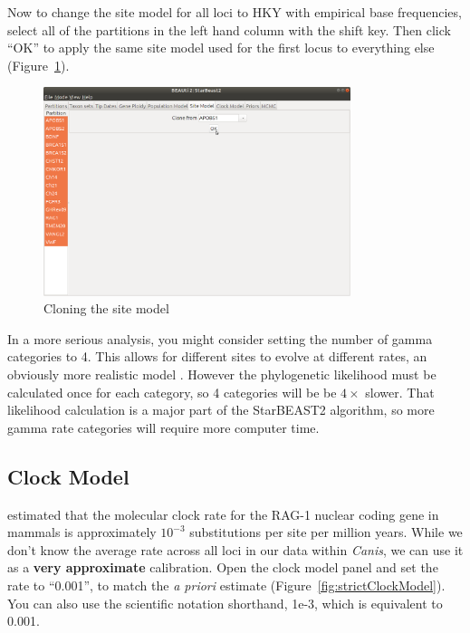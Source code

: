 \documentclass[12pt]{article}
\begin{document}
Now to change the site model for all loci to HKY with empirical base frequencies,
select all of the partitions in the left hand column with the shift key. Then
click ``OK'' to apply the same site model used for the first locus
to everything else (Figure~\ref{fig:cloneSiteModel}).

\begin{figure}[htb!]
\centering
\includegraphics[width=0.8\textwidth]{figures/cloneSiteModel.png}
\caption
{Cloning the site model}
\label{fig:cloneSiteModel}
\end{figure}

In a more serious analysis, you might consider setting the number of gamma
categories to 4. This allows for different sites to evolve at
different rates, an obviously more realistic model \citep{Yang1994}. However
the phylogenetic likelihood must be calculated once for each category, so 4
categories will be be $4\times$ slower. That likelihood calculation is a major
part of the StarBEAST2 algorithm, so more gamma rate categories will require
more computer time.

\clearpage

\subsection{Clock Model}
\label{subsec:clockModel}

\cite{Hugall2007} estimated that the molecular
clock rate for the RAG-1 nuclear coding gene in mammals is approximately
$10^{-3}$ substitutions per site per million years. While we don't know
the average rate across all loci in our data within \textit{Canis}, we can
use it as a \textbf{very approximate} calibration. Open the clock model panel
and set the rate to ``0.001'', to match the \textit{a priori} estimate
(Figure~\ref{fig:strictClockModel}). You can also use the scientific
notation shorthand, 1e-3, which is equivalent to 0.001.
\end{document}
